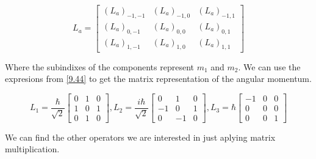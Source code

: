 \begin{equation}
  L_a =
    \left[\begin{matrix}
      (L_a)_{-1,-1} & (L_a)_{-1,0} & (L_a)_{-1,1}\\
      (L_a)_{0,-1} & (L_a)_{0,0} & (L_a)_{0,1}\\
      (L_a)_{1,-1} & (L_a)_{1,0} & (L_a)_{1,1}
    \end{matrix}\right]
\end{equation}

Where the subindixes of the components represent $m_1$ and $m_2$. We can use the expresions from \ref{9.44} to get the matrix representation of the angular momentum.


\begin{equation}
  L_1 = \frac{\hbar}{\sqrt{2}}
    \left[\begin{matrix}
      0 & 1 & 0\\
      1 & 0 & 1\\
      0 & 1 & 0
    \end{matrix}\right],
  L_2 = \frac{i\hbar}{\sqrt{2}}
    \left[\begin{matrix}
      0 & 1 & 0\\
      -1 & 0 & 1\\
      0 & -1 & 0
    \end{matrix}\right],
  L_3 = \hbar
    \left[\begin{matrix}
      -1 & 0 & 0\\
      0 & 0 & 0\\
      0 & 0 & 1
    \end{matrix}\right]
\end{equation}

We can find the other operators we are interested in just aplying matrix multiplication.


